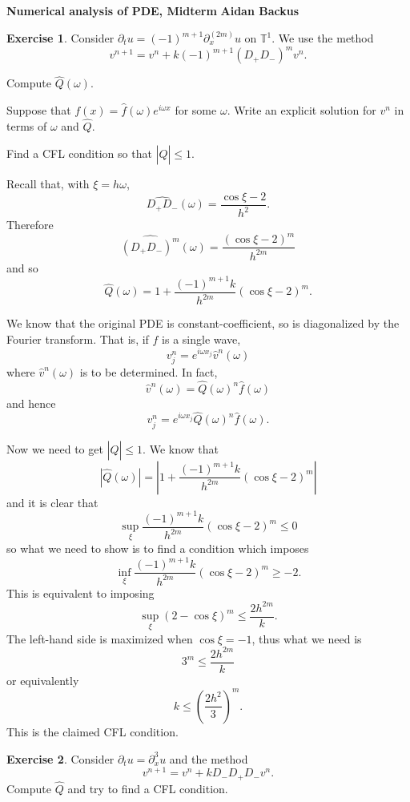 \documentclass[10pt]{article}
\newcommand{\Torus}{\mathbb T}
\theoremstyle{definition}
\newtheorem{exer}{Exercise}
\begin{document}
\noindent
\large\textbf{Numerical analysis of PDE, Midterm} \hfill \textbf{Aidan Backus} \\

\begin{exer}
Consider $\partial_t u = (-1)^{m + 1} \partial_x^{(2m)} u$ on $\Torus^1$.
We use the method
$$v^{n+1} = v^n + k(-1)^{m + 1}(D_+ D_-)^m v^n.$$

Compute $\hat Q(\omega)$.

Suppose that $f(x) = \hat f(\omega) e^{i\omega x}$ for some $\omega$.
Write an explicit solution for $v^n$ in terms of $\omega$ and $\hat Q$.

Find a CFL condition so that $|\hat Q| \leq 1$.
\end{exer}

Recall that, with $\xi = h\omega$,
$$\widehat{D_+ D_-}(\omega) = \frac{\cos \xi - 2}{h^2}.$$
Therefore
$$\widehat{(D_+ D_-)^m}(\omega) = \frac{(\cos \xi - 2)^m}{h^{2m}}$$
and so
$$\hat Q(\omega) = 1 + \frac{(-1)^{m + 1}k}{h^{2m}} (\cos \xi - 2)^m.$$

We know that the original PDE is constant-coefficient, so is diagonalized by the Fourier transform. That is, if $f$ is a single wave,
$$v^n_j = e^{i\omega x_j} \hat v^n(\omega)$$
where $\hat v^n(\omega)$ is to be determined. In fact,
$$\hat v^n(\omega) = \hat Q(\omega)^n \hat f(\omega)$$
and hence
$$v^n_j = e^{i\omega x_j} \hat Q(\omega)^n \hat f(\omega).$$

Now we need to get $|\hat Q| \leq 1$.
We know that
$$|\hat Q(\omega)| = \left|1 + \frac{(-1)^{m + 1}k}{h^{2m}}(\cos \xi - 2)^m\right|$$
and it is clear that
$$\sup_\xi \frac{(-1)^{m + 1}k}{h^{2m}}(\cos \xi - 2)^m \leq 0$$
so what we need to show is to find a condition which imposes
$$\inf_\xi \frac{(-1)^{m + 1}k}{h^{2m}}(\cos \xi - 2)^m \geq -2.$$
This is equivalent to imposing
$$\sup_\xi (2 - \cos \xi)^m \leq \frac{2h^{2m}}{k}.$$
The left-hand side is maximized when $\cos \xi = -1$, thus what we need is
$$3^m \leq \frac{2h^{2m}}{k}$$
or equivalently
$$k \leq \left(\frac{2h^2}{3}\right)^m.$$
This is the claimed CFL condition.

\begin{exer}
Consider $\partial_t u = \partial_x^3 u$ and the method
$$v^{n + 1} = v^n + kD_- D_+ D_- v^n.$$
Compute $\hat Q$ and try to find a CFL condition.
\end{exer}
\end{document}
